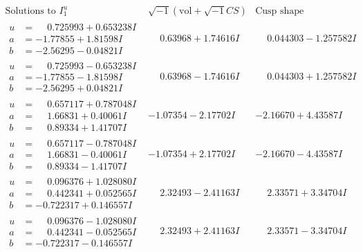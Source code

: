 \documentclass[1p]{elsarticle_modified}
\theoremstyle{definition}
\newcommand{\I}{\sqrt{-1}}
\begin{document}
$$\begin{array}{c|c|c}  
\text{Solutions to }I^u_{1}& \I (\text{vol} + \sqrt{-1}CS) & \text{Cusp shape}\\
 \hline 
\begin{aligned}
u &= \phantom{-}0.725993 + 0.653238 I \\
a &= -1.77855 + 1.81598 I \\
b &= -2.56295 - 0.04821 I\end{aligned}
 & \phantom{-}0.63968 + 1.74616 I & \phantom{-}0.044303 - 1.257582 I \\ \hline\begin{aligned}
u &= \phantom{-}0.725993 - 0.653238 I \\
a &= -1.77855 - 1.81598 I \\
b &= -2.56295 + 0.04821 I\end{aligned}
 & \phantom{-}0.63968 - 1.74616 I & \phantom{-}0.044303 + 1.257582 I \\ \hline\begin{aligned}
u &= \phantom{-}0.657117 + 0.787048 I \\
a &= \phantom{-}1.66831 + 0.40061 I \\
b &= \phantom{-}0.89334 + 1.41707 I\end{aligned}
 & -1.07354 - 2.17702 I & -2.16670 + 4.43587 I \\ \hline\begin{aligned}
u &= \phantom{-}0.657117 - 0.787048 I \\
a &= \phantom{-}1.66831 - 0.40061 I \\
b &= \phantom{-}0.89334 - 1.41707 I\end{aligned}
 & -1.07354 + 2.17702 I & -2.16670 - 4.43587 I \\ \hline\begin{aligned}
u &= \phantom{-}0.096376 + 1.028080 I \\
a &= \phantom{-}0.442341 + 0.052565 I \\
b &= -0.722317 + 0.146557 I\end{aligned}
 & \phantom{-}2.32493 - 2.41163 I & \phantom{-}2.33571 + 3.34704 I \\ \hline\begin{aligned}
u &= \phantom{-}0.096376 - 1.028080 I \\
a &= \phantom{-}0.442341 - 0.052565 I \\
b &= -0.722317 - 0.146557 I\end{aligned}
 & \phantom{-}2.32493 + 2.41163 I & \phantom{-}2.33571 - 3.34704 I \\ \hline\begin{aligned}

\end{aligned}
\end{array}$$
\end{document}
